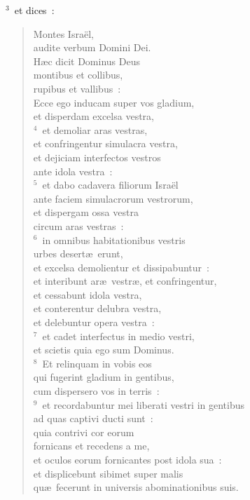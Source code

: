 ${}^{3}$~et dices~: \begin{flushleft}\begin{verse}Montes Isra\"el,\\ audite verbum Domini Dei.\\ H\ae c dicit Dominus Deus\\ montibus et collibus,\\ rupibus et vallibus~:\\ Ecce ego inducam super vos gladium,\\ et disperdam excelsa vestra,\\
${}^{4}$~et demoliar aras vestras,\\ et confringentur simulacra vestra,\\ et dejiciam interfectos vestros\\ ante idola vestra~:\\
${}^{5}$~et dabo cadavera filiorum Isra\"el\\ ante faciem simulacrorum vestrorum,\\ et dispergam ossa vestra\\ circum aras vestras~:\\
${}^{6}$~in omnibus habitationibus vestris\\ urbes desert\ae\ erunt,\\ et excelsa demolientur et dissipabuntur~:\\ et interibunt ar\ae\ vestr\ae , et confringentur,\\ et cessabunt idola vestra,\\ et conterentur delubra vestra,\\ et delebuntur opera vestra~:\\
${}^{7}$~et cadet interfectus in medio vestri,\\ et scietis quia ego sum Dominus.\\
${}^{8}$~Et relinquam in vobis eos\\ qui fugerint gladium in gentibus,\\ cum dispersero vos in terris~:\\
${}^{9}$~et recordabuntur mei liberati vestri in gentibus\\ ad quas captivi ducti sunt~:\\ quia contrivi cor eorum\\ fornicans et recedens a me,\\ et oculos eorum fornicantes post idola sua~:\\ et displicebunt sibimet super malis\\ qu\ae\ fecerunt in universis abominationibus suis.\\

\end{verse}
\end{flushleft}

